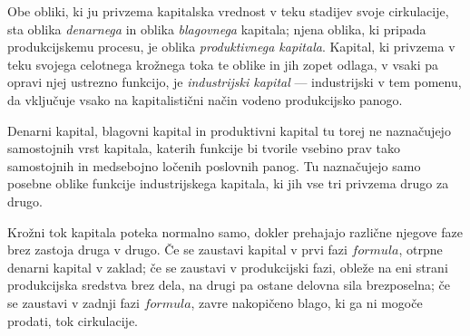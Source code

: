 \documentclass[a5paper]{scrbook}
\begin{document}
Obe obliki, ki ju privzema kapitalska vrednost v teku stadijev svoje cirkulacije, sta oblika \emph{denarnega} in oblika \emph{blagovnega} kapitala; njena oblika, ki pripada produkcijskemu procesu, je oblika \emph{produktivnega kapitala}. Kapital, ki privzema v teku svojega celotnega krožnega toka te oblike in jih zopet odlaga, v vsaki pa opravi njej ustrezno funkcijo, je \emph{industrijski kapital} --- industrijski v tem pomenu, da vključuje vsako na kapitalistični način vodeno produkcijsko panogo.

Denarni kapital, blagovni kapital in produktivni kapital tu torej ne naznačujejo samostojnih vrst kapitala, katerih funkcije bi tvorile vsebino prav tako samostojnih in medsebojno ločenih poslovnih panog. Tu naznačujejo samo posebne oblike funkcije industrijskega kapitala, ki jih vse tri privzema drugo za drugo.

Krožni tok kapitala poteka normalno samo, dokler prehajajo različne njegove faze brez zastoja druga v drugo. Če se zaustavi kapital v prvi fazi \( formula \), otrpne denarni kapital v zaklad; če se zaustavi v produkcijski fazi, obleže na eni strani produkcijska sredstva brez dela, na drugi pa ostane delovna sila brezposelna; če se zaustavi v zadnji fazi \( formula \), zavre nakopičeno blago, ki ga ni mogoče prodati, tok cirkulacije.
\end{document}
